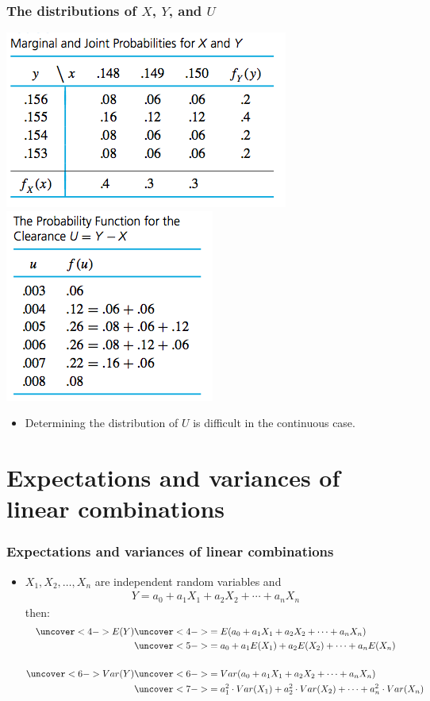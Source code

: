 \documentclass[handout]{beamer}\usepackage[]{graphicx}\usepackage[]{color}
\numberwithin{equation}{section}
\begin{document}
\begin{frame}
\frametitle{The distributions of $X$, $Y$, and $U$}
 \includegraphics{../../fig/platexy.png}
 \includegraphics{../../fig/plateu.png}
\begin{itemize}
\pause \item Determining the distribution of $U$ is difficult in the continuous case.
\end{itemize}
\end{frame}




\section{Expectations and variances of linear combinations}


\begin{frame}
\frametitle{Expectations and variances of linear combinations}
\begin{itemize}
\pause \item $X_1, X_2, \ldots, X_n$ are independent random variables and
\pause \begin{align*}
Y = a_0 + a_1 X_1 + a_2 X_2 + \cdots + a_n X_n
\end{align*} 
\pause then:
\begin{align*}
\uncover<4->{E(Y)} & \uncover<4->{= E(a_0 + a_1 X_1 + a_2 X_2 + \cdots + a_n X_n)} \\
&\uncover<5->{= a_0 + a_1 E(X_1) + a_2 E(X_2) + \cdots + a_n E(X_n)} \\ \\
\uncover<6->{Var(Y)} & \uncover<6->{= Var(a_0 + a_1 X_1 + a_2 X_2 + \cdots + a_n X_n)} \\
&\uncover<7->{= a_1^2 \cdot Var(X_1) + a_2^2  \cdot Var(X_2) + \cdots + a_n^2 \cdot Var(X_n)}
\end{align*}
\end{itemize}
\end{frame}
\end{document}

